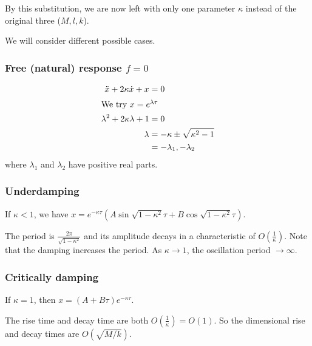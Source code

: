 \documentclass[a4paper]{article}
\begin{document}
By this substitution, we are now left with only one parameter $\kappa$ instead of the original three ($M, l, k$).

We will consider different possible cases.

\subsubsection*{Free (natural) response \texorpdfstring{$f = 0$}{f = 0}}
\begin{align*}
  \ddot x + 2\kappa \dot x + x &= 0\\
  \intertext{We try $x = e^{\lambda \tau}$}
  \lambda^2 + 2\kappa\lambda + 1 &= 0\\
  \lambda &= -\kappa \pm \sqrt{\kappa^2 - 1}\\
  &= -\lambda_1, -\lambda_2
\end{align*}
where $\lambda_1$ and $\lambda_2$ have positive real parts.

\subsubsection*{Underdamping}
If $\kappa < 1$, we have $x = e^{-\kappa\tau}(A\sin \sqrt{1 - \kappa^2}\tau  +B\cos \sqrt{1 - \kappa^2}\tau)$.

The period is $\frac{2\pi}{\sqrt{1 - \kappa^2}}$ and its amplitude decays in a characteristic of $O(\frac{1}{\kappa})$. Note that the damping increases the period. As $\kappa \to 1$, the oscillation period $\to \infty$.
\begin{center}
\end{center}

\subsubsection*{Critically damping}
If $\kappa = 1$, then $x = (A + B\tau)e^{-\kappa\tau}$.

The rise time and decay time are both $O(\frac{1}{\kappa}) = O(1)$. So the dimensional rise and decay times are $O(\sqrt{M/k})$.
\begin{center}
\end{center}
\end{document}
